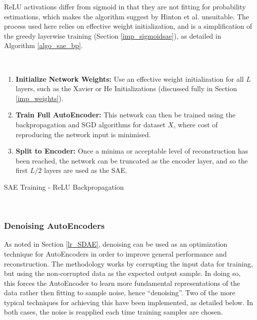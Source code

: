 \documentclass[a4paper,11pt,oneside]{article}
\theoremstyle{plain}
\theoremstyle{definition}
\begin{document}
	ReLU activations differ from sigmoid in that they are not fitting for probability estimations, which makes the algorithm suggest by Hinton et al. unsuitable. The process used here relies on effective weight initialization, and is a simplification of the greedy layerwise training (Section \ref{imp_sigmoidsae}), as detailed in Algorithm \ref{algo_sae_bp}. \newline 
	
	\begin{algorithm}[H]
		\texttt{\\}
		
	\begin{enumerate}
		\item \textbf{Initialize Network Weights:} Use an effective weight initialization for all $L$ layers, such as the Xavier or He Initializations (discussed fully in Section \ref{imp_weights}).
		\item  \textbf{Train Full AutoEncoder:} This network can then be trained using the backpropagation and SGD algorithms for dataset $X$, where cost of reproducing the network input is minimised.
		\item \textbf{Split to Encoder:} Once a minima or acceptable level of reconstruction has been reached, the network can be truncated as the encoder layer, and so the first $L/2$ layers are used as the SAE.
	\end{enumerate}
		
		\label{algo_sae_bp}
		\caption{SAE Training - ReLU Backpropagation}
	\end{algorithm}
	~\\
	
	\subsubsection{Denoising AutoEncoders}\label{imp_denoising}
	
	As noted in Section \ref{lr_SDAE}, denoising can be used as an optimization technique for AutoEncoders in order to improve general performance and reconstruction. The methodology works by corrupting the input data for training, but using the non-corrupted data as the expected output sample. In doing so, this forces the AutoEncoder to learn more fundamental representations of the data rather then fitting to sample noise, hence ``denoising''. Two of the more typical techniques for achieving this have been implemented, as detailed below. In both cases, the noise is reapplied each time training samples are chosen.
	
\end{document}
